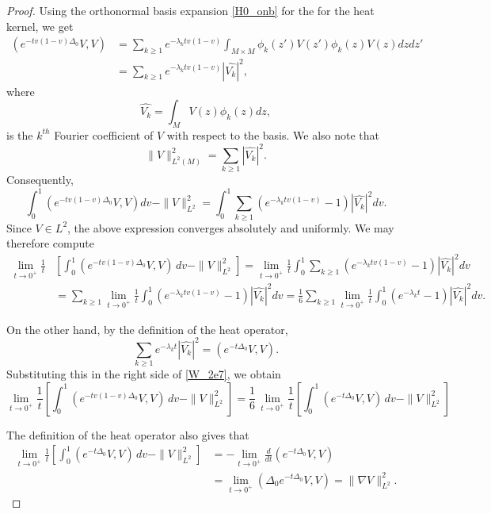 \documentclass[letterpaper,12pt]{amsart}
\def \n{\nabla}
\def \n{\nabla}
\def \eref{\eqref}
\begin{document}
\begin{proof}
Using the orthonormal basis expansion \eref{H0_onb} for the for the heat kernel, we get
\begin{align*}(e^{-tv(1-v) \Delta_0} V, V) &= \sum_{k \geq 1} e^{-\lambda_k t v (1-v)} \int_{M \times M} \phi_k (z') V(z') \phi_k (z) V(z) dz dz'  \\
&= \sum_{k \geq 1} e^{-\lambda_k t v (1-v)}  |\widehat{V_k}|^2,
\end{align*}
where
$$\widehat{V_k} = \int_M V(z) \phi_k (z) dz,$$
is the $k^{th}$ Fourier coefficient of $V$ with respect to the basis.  We also note that
$$\|V\|_{L^2 (M)} ^2 = \sum_{k \geq 1} |\widehat{V_k}|^2.$$
Consequently,
$$\int_0 ^1 (e^{-tv(1-v) \Delta_0} V, V) dv - \|V\|^2 _{L^2} = \int_0 ^1 \sum_{k \geq 1} (e^{-\lambda_k t v (1-v)} -1) |\widehat{V_k}|^2 dv.$$
Since $V \in L^2$, the above expression converges absolutely and uniformly.  We may therefore compute
\begin{equation} \label{W_2e7}
\begin{split}
\lim_{t \to 0^+} \frac{1}{t}  &\left[ \int_0^1( e^{-tv(1-v) \Delta_0}  V, V) \,dv  - \| V \|_{L^2}^2 \right] = \lim_{t \to 0^+} \frac{1}{t}  \int_0 ^1 \sum_{k \geq 1} (e^{-\lambda_k t v (1-v)} -1) |\widehat{V_k}|^2 dv \\
&=\sum_{k \geq 1} \lim_{t \to 0^+} \frac{1}{t} \int_0 ^1 (e^{-\lambda_k t v (1-v)} -1) |\widehat{V_k}|^2 dv  = \frac{1}{6} \sum_{k \geq 1} \lim_{t \to 0^+} \frac{1}{t} \int_0 ^1 (e^{-\lambda_k t } -1) |\widehat{V_k}|^2 dv.
\end{split}
\end{equation}

On the other hand, by the definition of the heat operator,
$$\sum_{k \geq 1} e^{-\lambda_k t} |\widehat{V_k}|^2 = (e^{-t \Delta_0} V, V).$$
Substituting this in the right side of \eref{W_2e7}, we obtain
\begin{equation} \label{W_2e3}
\lim_{t\to 0^+ } \frac {1}{t} \left[ \int_0^1( e^{-tv(1-v) \Delta_0}  V, V) \,dv  - \| V \|_{L^2}^2 \right] = \frac 16 \,  \lim_{t\to 0^+ } \frac {1}{t} \left[ \int_0^1( e^{-t\Delta_0}  V, V) \,dv  - \| V \|_{L^2}^2 \right]
\end{equation}

The definition of the heat operator also gives that
\begin{equation} \label{W_2e4}
\begin{split}
\lim_{t\to 0^+ } \frac {1}{t} \left[ \int_0^1( e^{-t\Delta_0}  V, V) \,dv  - \| V \|_{L^2}^2 \right]&  =  - \lim_{t\to 0^+ } \frac{d}{dt}(e^{-t\Delta_0} V, V)   \\
&=  \lim_{t\to 0^+ }  (\Delta_0  e^{-t\Delta_0} V, V) =  \| \n V\|_{L^2}^2.%
\end{split}
\end{equation}


\end{proof}
\end{document}
